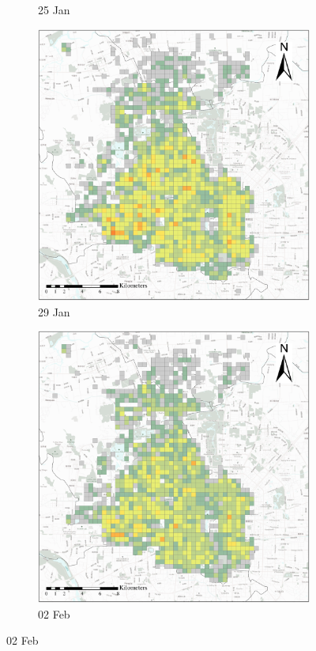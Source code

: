 \documentclass[preprints,ijgi,submit,moreauthors]{Definitions/mdpi}
\begin{document}
\begin{figure}[ht]
\begin{subfigure}{.23\textwidth}
        \caption{25 Jan}
    \end{subfigure}
    \begin{subfigure}{.23\textwidth}
        \includegraphics[width=\textwidth]{Figures/Overall_spatial_patterns/FN5_D2020_01_29.eps}
        \caption{29 Jan}
    \end{subfigure}
        \begin{subfigure}{.23\textwidth}
        \includegraphics[width=\textwidth]{Figures/Overall_spatial_patterns/FN5_D2020_02_02.eps}
        \caption{02 Feb}
    \end{subfigure}
    

\end{figure}
\end{document}

